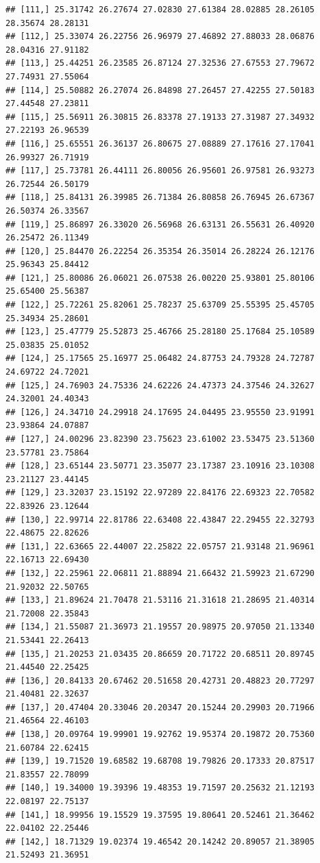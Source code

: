 \documentclass{article}\usepackage[]{graphicx}\usepackage[]{color}
\makeatletter
\newenvironment{kframe}{%
 \def\at@end@of@kframe{}%
 \ifinner\ifhmode%
  \def\at@end@of@kframe{\end{minipage}}%
  \begin{minipage}{\columnwidth}%
 \fi\fi%
 \def\FrameCommand##1{\hskip\@totalleftmargin \hskip-\fboxsep
 \colorbox{shadecolor}{##1}\hskip-\fboxsep
     \hskip-\linewidth \hskip-\@totalleftmargin \hskip\columnwidth}%
 \MakeFramed {\advance\hsize-\width
   \@totalleftmargin\z@ \linewidth\hsize
   \@setminipage}}%
 {\par\unskip\endMakeFramed%
 \at@end@of@kframe}
\newenvironment{knitrout}{}{} %
\makeatother
\begin{document}
\begin{knitrout}
\begin{kframe}
\begin{verbatim}
## [111,] 25.31742 26.27674 27.02830 27.61384 28.02885 28.26105 28.35674 28.28131
## [112,] 25.33074 26.22756 26.96979 27.46892 27.88033 28.06876 28.04316 27.91182
## [113,] 25.44251 26.23585 26.87124 27.32536 27.67553 27.79672 27.74931 27.55064
## [114,] 25.50882 26.27074 26.84898 27.26457 27.42255 27.50183 27.44548 27.23811
## [115,] 25.56911 26.30815 26.83378 27.19133 27.31987 27.34932 27.22193 26.96539
## [116,] 25.65551 26.36137 26.80675 27.08889 27.17616 27.17041 26.99327 26.71919
## [117,] 25.73781 26.44111 26.80056 26.95601 26.97581 26.93273 26.72544 26.50179
## [118,] 25.84131 26.39985 26.71384 26.80858 26.76945 26.67367 26.50374 26.33567
## [119,] 25.86897 26.33020 26.56968 26.63131 26.55631 26.40920 26.25472 26.11349
## [120,] 25.84470 26.22254 26.35354 26.35014 26.28224 26.12176 25.96343 25.84412
## [121,] 25.80086 26.06021 26.07538 26.00220 25.93801 25.80106 25.65400 25.56387
## [122,] 25.72261 25.82061 25.78237 25.63709 25.55395 25.45705 25.34934 25.28601
## [123,] 25.47779 25.52873 25.46766 25.28180 25.17684 25.10589 25.03835 25.01052
## [124,] 25.17565 25.16977 25.06482 24.87753 24.79328 24.72787 24.69722 24.72021
## [125,] 24.76903 24.75336 24.62226 24.47373 24.37546 24.32627 24.32001 24.40343
## [126,] 24.34710 24.29918 24.17695 24.04495 23.95550 23.91991 23.93864 24.07887
## [127,] 24.00296 23.82390 23.75623 23.61002 23.53475 23.51360 23.57781 23.75864
## [128,] 23.65144 23.50771 23.35077 23.17387 23.10916 23.10308 23.21127 23.44145
## [129,] 23.32037 23.15192 22.97289 22.84176 22.69323 22.70582 22.83926 23.12644
## [130,] 22.99714 22.81786 22.63408 22.43847 22.29455 22.32793 22.48675 22.82626
## [131,] 22.63665 22.44007 22.25822 22.05757 21.93148 21.96961 22.16713 22.69430
## [132,] 22.25961 22.06811 21.88894 21.66432 21.59923 21.67290 21.92032 22.50765
## [133,] 21.89624 21.70478 21.53116 21.31618 21.28695 21.40314 21.72008 22.35843
## [134,] 21.55087 21.36973 21.19557 20.98975 20.97050 21.13340 21.53441 22.26413
## [135,] 21.20253 21.03435 20.86659 20.71722 20.68511 20.89745 21.44540 22.25425
## [136,] 20.84133 20.67462 20.51658 20.42731 20.48823 20.77297 21.40481 22.32637
## [137,] 20.47404 20.33046 20.20347 20.15244 20.29903 20.71966 21.46564 22.46103
## [138,] 20.09764 19.99901 19.92762 19.95374 20.19872 20.75360 21.60784 22.62415
## [139,] 19.71520 19.68582 19.68708 19.79826 20.17333 20.87517 21.83557 22.78099
## [140,] 19.34000 19.39396 19.48353 19.71597 20.25632 21.12193 22.08197 22.75137
## [141,] 18.99956 19.15529 19.37595 19.80641 20.52461 21.36462 22.04102 22.25446
## [142,] 18.71329 19.02374 19.46542 20.14242 20.89057 21.38905 21.52493 21.36951

\end{verbatim}
\end{kframe}
\end{knitrout}
\end{document}
